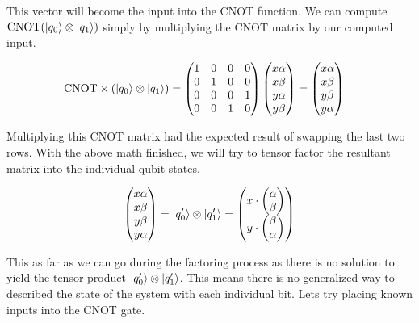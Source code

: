 \documentclass[conference]{IEEEtran}
\begin{document}
This vector will become the input into the CNOT function. We can compute $\text{CNOT}(\ket{q_0}\otimes\ket{q_1})$ simply by multiplying the CNOT matrix by our computed input.

\begin{align*}
\text{CNOT} \times (\ket{q_0} \otimes \ket{q_1}) &= \begin{pmatrix}
	1 & 0 & 0 & 0\\
	0 & 1 & 0 & 0\\
	0 & 0 & 0 & 1\\
	0 & 0 & 1 & 0
\end{pmatrix} \begin{pmatrix}x\alpha\\x\beta\\y\alpha\\y\beta\end{pmatrix} = \begin{pmatrix}x\alpha\\x\beta\\y\beta\\y\alpha\end{pmatrix}
\end{align*}

Multiplying this CNOT matrix had the expected result of swapping the last two rows. With the above math finished, we will try to tensor factor the resultant matrix into the individual qubit states.

\begin{align*}
\begin{pmatrix} x\alpha \\ x\beta \\ y\beta \\ y\alpha \end{pmatrix} &= \ket{q_0'} \otimes \ket{q_1'}
= \begin{pmatrix}
x \cdot \begin{pmatrix}\alpha\\\beta\end{pmatrix}\\
y \cdot \begin{pmatrix}\beta\\\alpha\end{pmatrix}
\end{pmatrix}\\
\end{align*}

This as far as we can go during the factoring process as there is no solution to yield the tensor product $\ket{q_0'} \otimes \ket{q_1'}$. This means there is no generalized way to described the state of the system with each individual bit. Lets try placing known inputs into the CNOT gate.
\end{document}
